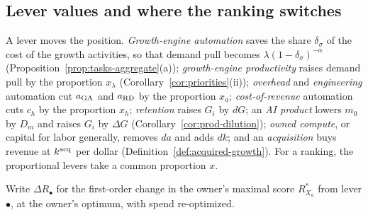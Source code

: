 \subsection{Lever values and where the ranking switches}\label{sec:playbook-rank}

\begin{definition}[Levers]\label{def:playbook-levers}
A lever moves the position. \emph{Growth-engine automation} saves the share $\delta_\sigma$ of the cost of the growth activities, so that demand pull becomes $\lambda(1-\delta_\sigma)^{-\alpha}$ (Proposition~\ref{prop:tasks-aggregate}(a)); \emph{growth-engine productivity} raises demand pull by the proportion $x_\lambda$ (Corollary~\ref{cor:priorities}(ii)); \emph{overhead} and \emph{engineering} automation cut $a_{\rm GA}$ and $a_{\rm RD}$ by the proportion $x_a$; \emph{cost-of-revenue} automation cuts $c_h$ by the proportion $x_h$; \emph{retention} raises $G_i$ by $dG$; an \emph{AI product} lowers $m_0$ by $D_m$ and raises $G_i$ by $\Delta G$ (Corollary~\ref{cor:prod-dilution}); \emph{owned compute}, or capital for labor generally, removes $da$ and adds $dk$; and an \emph{acquisition} buys revenue at $k^{\rm acq}$ per dollar (Definition~\ref{def:acquired-growth}). For a ranking, the proportional levers take a common proportion $x$.
\end{definition}

Write $\Delta R_\bullet$ for the first-order change in the owner's maximal score $R^*_{X_{\mathsf o}}$ from lever $\bullet$, at the owner's optimum, with spend re-optimized.

